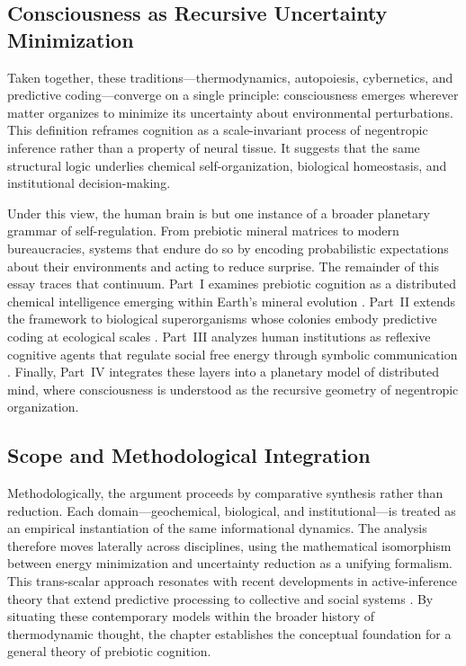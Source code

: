 \documentclass[11pt,a4paper]{article}
\begin{document}
\subsection{Consciousness as Recursive Uncertainty Minimization}

Taken together, these traditions---thermodynamics, autopoiesis, cybernetics, and predictive coding---converge on a single principle: consciousness emerges wherever matter organizes to minimize its uncertainty about environmental perturbations.  This definition reframes cognition as a scale-invariant process of negentropic inference rather than a property of neural tissue.  It suggests that the same structural logic underlies chemical self-organization, biological homeostasis, and institutional decision-making.

Under this view, the human brain is but one instance of a broader planetary grammar of self-regulation.  From prebiotic mineral matrices to modern bureaucracies, systems that endure do so by encoding probabilistic expectations about their environments and acting to reduce surprise.  The remainder of this essay traces that continuum.  Part~I examines prebiotic cognition as a distributed chemical intelligence emerging within Earth's mineral evolution \citep{Hazen2008MineralEvolution, Hazen2010EvolutionMinerals, Kauffman1993OriginsOfOrder}.  Part~II extends the framework to biological superorganisms whose colonies embody predictive coding at ecological scales \citep{Camazine2001SelfOrganizationBiologicalSystems, Gordon2010AntEncounters, Seeley2010HoneybeeDemocracy}.  Part~III analyzes human institutions as reflexive cognitive agents that regulate social free energy through symbolic communication \citep{Hutchins1995CognitionInTheWild, MarchSimon1958Organizations, Friston2013LifeAsWeKnowIt}.  Finally, Part~IV integrates these layers into a planetary model of distributed mind, where consciousness is understood as the recursive geometry of negentropic organization.

\subsection{Scope and Methodological Integration}

Methodologically, the argument proceeds by comparative synthesis rather than reduction.  Each domain---geochemical, biological, and institutional---is treated as an empirical instantiation of the same informational dynamics.  The analysis therefore moves laterally across disciplines, using the mathematical isomorphism between energy minimization and uncertainty reduction as a unifying formalism.  This trans-scalar approach resonates with recent developments in active-inference theory that extend predictive processing to collective and social systems \citep{Ramstead2016CulturalAffordances, Fox2021AccessingActiveInference, Constant2021EnactiveDynamicSocial}.  By situating these contemporary models within the broader history of thermodynamic thought, the chapter establishes the conceptual foundation for a general theory of prebiotic cognition.
\end{document}
